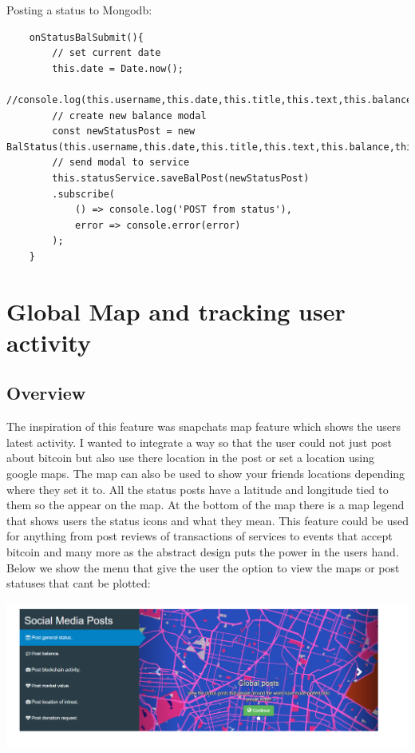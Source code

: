 Posting a status to Mongodb:
\begin{lstlisting}
    onStatusBalSubmit(){
        // set current date
        this.date = Date.now();
        //console.log(this.username,this.date,this.title,this.text,this.balance,this.lat,this.long)
        // create new balance modal
        const newStatusPost = new BalStatus(this.username,this.date,this.title,this.text,this.balance,this.lat,this.long);
        // send modal to service
        this.statusService.saveBalPost(newStatusPost)
        .subscribe(
            () => console.log('POST from status'),
            error => console.error(error)
        );
    }

\end{lstlisting}

\section{Global Map and tracking user activity}

\subsection{Overview}
The inspiration of this feature was snapchats map feature which shows the users latest activity. I wanted to integrate a way so that the user could not just post about bitcoin but also use there location in the post or set a location using google maps. The map can also be used to show your friends locations depending where they set it to. All the status posts have a latitude and longitude tied to them so the appear on the map. At the bottom of the map there is a map legend that shows users the status icons and what they mean. This feature could be used for anything from post reviews of transactions of services to events that accept bitcoin and many more as the abstract design puts the power in the users hand. Below we show the menu that give the user the option to view the maps or post statuses that cant be plotted:

\includegraphics[]{img/mapmenu.png}

